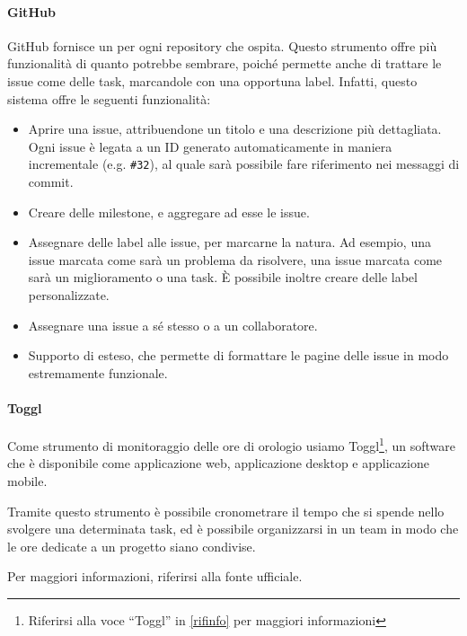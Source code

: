     		\paragraph{GitHub}\label{GitHub}
			GitHub fornisce un  per ogni repository che ospita. Questo strumento offre più funzionalità di quanto potrebbe sembrare,
			poich\'e permette anche di trattare le issue come delle task, marcandole con una opportuna label. Infatti, questo sistema offre le seguenti funzionalità:
			\begin{itemize}
				\item Aprire una issue, attribuendone un titolo e una descrizione più dettagliata. Ogni issue è legata a un ID generato automaticamente in maniera
					incrementale (e.g. \texttt{\#32}), al quale sarà possibile fare riferimento nei messaggi di commit.
				\item Creare delle milestone, e aggregare ad esse le issue.
				\item Assegnare delle label alle issue, per marcarne la natura. Ad esempio, una issue marcata come  sarà un problema da risolvere, una
					issue marcata come  sarà un miglioramento o una task. È possibile inoltre creare delle label personalizzate.
				\item Assegnare una issue a s\'e stesso o a un collaboratore.
				\item Supporto di  esteso, che permette di
				formattare le pagine delle issue in modo estremamente funzionale.
			\end{itemize}


			\paragraph{Toggl}\label{toggl}
			Come strumento di monitoraggio delle ore di orologio usiamo Toggl\footnote{Riferirsi alla voce ``Toggl'' in \ref{rifinfo} per maggiori informazioni},
			un software che è disponibile come applicazione web, applicazione
			desktop e applicazione mobile.\par
			Tramite questo strumento è possibile cronometrare il tempo che si spende nello svolgere una determinata task, ed è possibile organizzarsi in un team
			in modo che le ore dedicate a un progetto siano condivise.\par
			Per maggiori informazioni, riferirsi alla fonte ufficiale.





